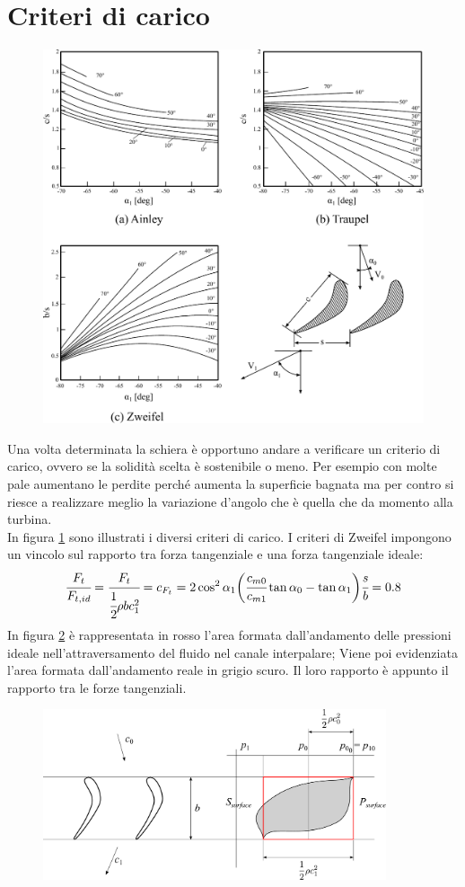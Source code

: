 \section{Criteri di carico}
\begin{figure}
\centering
  \includegraphics[width=\textwidth]{fig/Ainley.pdf}
\caption{}
\label{fig:Ainley}
\end{figure}
Una volta determinata la schiera è opportuno andare a verificare un criterio di carico, ovvero se la solidità scelta è sostenibile o meno. Per esempio con molte pale aumentano le perdite perché aumenta la superficie bagnata ma per contro si riesce a realizzare meglio la variazione d'angolo che è quella che da momento alla turbina.\\
In figura \ref{fig:Ainley} sono illustrati i diversi criteri di carico. I criteri di Zweifel impongono un vincolo sul rapporto tra forza tangenziale e una forza tangenziale ideale:
\begin{align*}
\cfrac{F_t}{F_{t,id}} = \cfrac{F_t}{\cfrac{1}{2} \rho b c_1^2} = c_{F_t} = 2 \cos^2 \alpha_1 \bigg(\cfrac{c_{m0}}{c_{m1}} \tan \alpha_0 - \tan \alpha_1 \bigg) \cfrac{s}{b} = 0.8
\end{align*}
In figura \ref{fig:CritCaricoT} è rappresentata in rosso l'area formata dall'andamento delle pressioni ideale nell'attraversamento del fluido nel canale interpalare; Viene poi evidenziata l'area formata dall'andamento reale in grigio scuro. Il loro rapporto è appunto il rapporto tra le forze tangenziali.
\begin{figure}[h!]
\centering
  \includegraphics[width=0.9\textwidth]{fig/CritCaricoT.pdf}
\caption{}
\label{fig:CritCaricoT}
\end{figure}